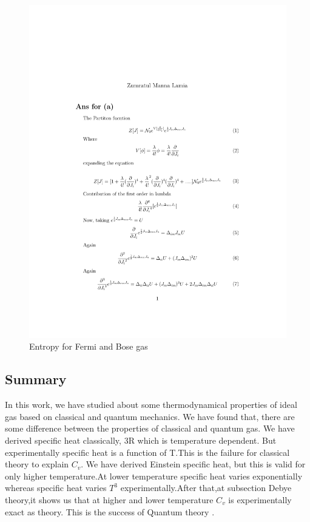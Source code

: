 \documentclass{article}
\newcommand*{\1}{\hspace{1pt}}
\begin{document}
\newpage
\begin{figure}[htb!]
    \centering
    \includegraphics[scale=0.7]{lamia}
    \caption{Entropy for Fermi and Bose gas}
    \label{fig:my_label}
\end{figure}

\newpage

\subsection{Summary}

In this work, we have studied about some thermodynamical properties of ideal gas based on classical and quantum mechanics. We have found that, there are some difference between the properties of classical and quantum gas. We have derived specific heat classically, 3R which is temperature dependent. But experimentally specific heat is a function of T.This is the failure for classical theory to explain $C_v$. We have derived Einstein specific heat, but this is valid for only higher temperature.At lower temperature specific heat varies exponentially whereas specific heat varies $T^3$ experimentally.After that,at subsection Debye theory,it shows us that at higher and lower temperature $C_v$ is experimentally exact as theory. This is the success of Quantum theory .\\
\end{document}
